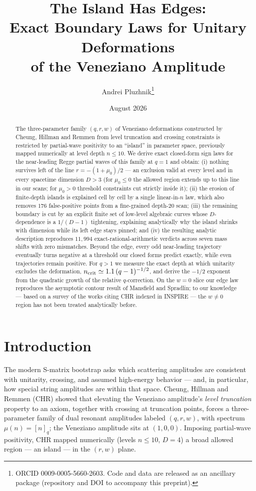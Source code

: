 \documentclass[11pt]{article}
\title{The Island Has Edges:\\ Exact Boundary Laws for Unitary Deformations\\ of the Veneziano Amplitude}
\author{Andrei Pluzhnik\thanks{ORCID 0009-0005-5660-2603. Code and data are
released as an ancillary package (repository and DOI to accompany this
preprint).}}
\date{August 2026}
\begin{document}
\maketitle

\begin{abstract}
The three-parameter family $(q,r,w)$ of Veneziano deformations constructed by
Cheung, Hillman and Remmen from level truncation and crossing constraints is
restricted by partial-wave positivity to an ``island'' in parameter space,
previously mapped numerically at level depth $n\le 10$. We derive exact
closed-form sign laws for the near-leading Regge partial waves of this family
at $q=1$ and obtain: (i) nothing survives left of the line
$r=-(1+\mu_0)/2$ --- an exclusion valid at every level and in every spacetime
dimension $D>3$ (for $\mu_0\le 0$ the allowed region extends up to this line
in our scans; for $\mu_0>0$ threshold constraints cut strictly inside it);
(ii) the erosion of finite-depth islands is explained cell by cell by a
single linear-in-$n$ law, which also removes $176$ false-positive points from a
fine-grained depth-$20$ scan; (iii) the remaining boundary is cut by an
explicit finite set of low-level algebraic curves whose $D$-dependence is a
$1/(D-1)$ tightening, explaining analytically why the island shrinks with
dimension while its left edge stays pinned; and (iv) the resulting analytic
description reproduces $11{,}994$ exact-rational-arithmetic verdicts across
seven mass shifts with zero mismatches. Beyond the edge, every odd
near-leading trajectory eventually turns negative at a threshold our closed
forms predict exactly, while even trajectories remain positive. For $q>1$ we
measure the exact depth at which unitarity excludes the deformation,
$n_{\rm crit}\simeq 1.1\,(q-1)^{-1/2}$, and derive the $-1/2$ exponent from
the quadratic growth of the relative $q$-correction. On the $w=0$ slice our
edge law reproduces the asymptotic contour result of Mansfield and Spradlin;
to our knowledge --- based on a survey of the works citing CHR indexed in
INSPIRE --- the $w\neq 0$ region has not been treated analytically before.
\end{abstract}

\section{Introduction}

The modern S-matrix bootstrap asks which scattering amplitudes are consistent
with unitarity, crossing, and assumed high-energy behavior --- and, in
particular, how special string amplitudes are within that space. Cheung,
Hillman and Remmen (CHR) \cite{CHR2024} showed that elevating the Veneziano
amplitude's \emph{level truncation} property to an axiom, together with
crossing at truncation points, forces a three-parameter family of dual
resonant amplitudes labeled $(q,r,w)$, with spectrum $\mu(n)=[n]_q$; the
Veneziano amplitude sits at $(1,0,0)$. Imposing partial-wave positivity, CHR
mapped numerically (levels $n\le 10$, $D=4$) a broad allowed region --- an
island --- in the $(r,w)$ plane.
\end{document}
